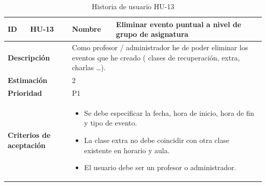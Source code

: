\begin{table}[H]
    \centering
    \begin{tabular}{|p{2cm}|p{4cm}|p{2cm}|p{4cm}|}
        \hline
        \textbf{ID} & HU-13 & \textbf{Nombre} & Eliminar evento puntual a nivel de grupo de asignatura \\
        \hline
        \multicolumn{2}{|p{6cm}|}{\textbf{Descripción}} & \multicolumn{2}{p{6cm}|}{Como profesor / administrador he de poder eliminar los eventos que he creado ( clases de recuperación, extra, charlas …).} \\
        \hline
        \multicolumn{2}{|p{6cm}|}{\textbf{Estimación}} & \multicolumn{2}{p{6cm}|}{2} \\
        \hline
        \multicolumn{2}{|p{6cm}|}{\textbf{Prioridad}} & \multicolumn{2}{p{6cm}|}{P1} \\
        \hline
        \multicolumn{2}{|p{6cm}|}{\textbf{Criterios de aceptación}} & \multicolumn{2}{p{6cm}|}{
            \begin{itemize}
                \item Se debe especificar la fecha, hora de inicio, hora de fin y tipo de evento.
                \item La clase extra no debe coincidir con otra clase existente en horario y aula.
                \item El usuario debe ser un profesor o administrador.
            \end{itemize}
        } \\
        \hline
    \end{tabular}
    \caption{Historia de usuario HU-13}
    \label{tab:hu_13}
\end{table}


